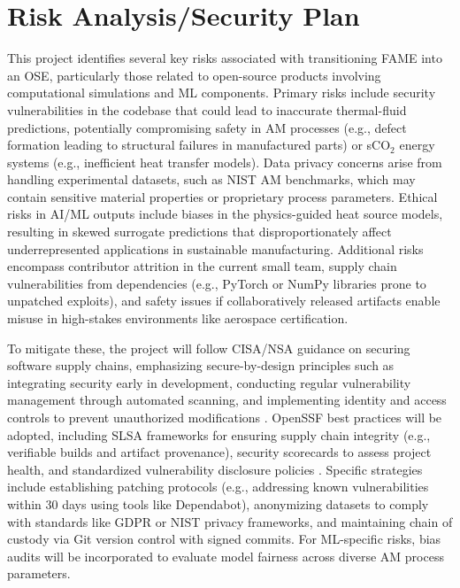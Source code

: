 \documentclass[11pt]{article}
\begin{document}
\section*{Risk Analysis/Security Plan}
\vspace{-3pt}
\noindent
This project identifies several key risks associated with transitioning FAME into an OSE, particularly those related to open-source products involving computational simulations and ML components. Primary risks include security vulnerabilities in the codebase that could lead to inaccurate thermal-fluid predictions, potentially compromising safety in AM processes (e.g., defect formation leading to structural failures in manufactured parts) or sCO$_2$ energy systems (e.g., inefficient heat transfer models). Data privacy concerns arise from handling experimental datasets, such as NIST AM benchmarks, which may contain sensitive material properties or proprietary process parameters. Ethical risks in AI/ML outputs include biases in the physics-guided heat source models, resulting in skewed surrogate predictions that disproportionately affect underrepresented applications in sustainable manufacturing. Additional risks encompass contributor attrition in the current small team, supply chain vulnerabilities from dependencies (e.g., PyTorch or NumPy libraries prone to unpatched exploits), and safety issues if collaboratively released artifacts enable misuse in high-stakes environments like aerospace certification.

To mitigate these, the project will follow CISA/NSA guidance on securing software supply chains, emphasizing secure-by-design principles such as integrating security early in development, conducting regular vulnerability management through automated scanning, and implementing identity and access controls to prevent unauthorized modifications \cite{souppayaSecureSoftwareDevelopment2022}. OpenSSF best practices will be adopted, including SLSA frameworks for ensuring supply chain integrity (e.g., verifiable builds and artifact provenance), security scorecards to assess project health, and standardized vulnerability disclosure policies \cite{SLSAOpenSource}. Specific strategies include establishing patching protocols (e.g., addressing known vulnerabilities within 30 days using tools like Dependabot), anonymizing datasets to comply with standards like GDPR or NIST privacy frameworks, and maintaining chain of custody via Git version control with signed commits. For ML-specific risks, bias audits will be incorporated to evaluate model fairness across diverse AM process parameters.
\end{document}
